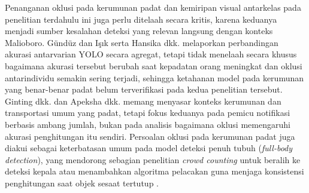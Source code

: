 Penanganan oklusi pada kerumunan padat dan kemiripan visual antarkelas pada penelitian 
terdahulu ini juga perlu ditelaah secara kritis, karena keduanya menjadi sumber kesalahan 
deteksi yang relevan langsung dengan konteks Malioboro. Gündüz dan Işık \cite{gunduz2023new} 
serta Hansika dkk. \cite{hansika2024privacy} melaporkan perbandingan akurasi antarvarian 
YOLO secara agregat, tetapi tidak menelaah secara khusus bagaimana akurasi tersebut berubah 
saat kepadatan orang meningkat dan oklusi antarindividu semakin sering terjadi, sehingga 
ketahanan model pada kerumunan yang benar-benar padat belum terverifikasi pada kedua 
penelitian tersebut. Ginting dkk. \cite{ginting2021crowd} dan Apeksha dkk. 
\cite{apeksha2025transit} memang menyasar konteks kerumunan dan transportasi umum yang 
padat, tetapi fokus keduanya pada pemicu notifikasi berbasis ambang jumlah, bukan pada 
analisis bagaimana oklusi memengaruhi akurasi penghitungan itu sendiri. Persoalan oklusi 
pada kerumunan padat juga diakui sebagai keterbatasan umum pada model deteksi penuh tubuh 
(\textit{full-body detection}), yang mendorong sebagian penelitian \textit{crowd counting} untuk 
beralih ke deteksi kepala atau menambahkan algoritma pelacakan guna menjaga konsistensi 
penghitungan saat objek sesaat tertutup \cite{hansika2024privacy}.

